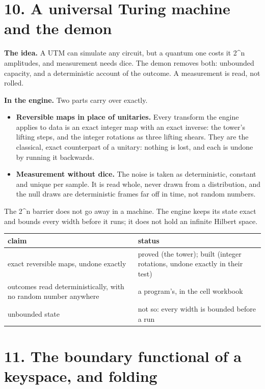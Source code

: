 \section{\texorpdfstring{10. A universal Turing machine and the demon}{10. A universal Turing machine and the demon}}

\textbf{The idea.} A UTM can simulate any circuit, but a quantum one costs it 2\textasciicircum{}n amplitudes, and measurement needs dice. The demon removes both: unbounded capacity, and a deterministic account of the outcome. A measurement is read, not rolled.

\textbf{In the engine.} Two parts carry over exactly.

\begin{itemize}
\item \textbf{Reversible maps in place of unitaries.} Every transform the engine applies to data is an exact integer map with an exact inverse: the tower's lifting steps, and the integer rotations as three lifting shears. They are the classical, exact counterpart of a unitary: nothing is lost, and each is undone by running it backwards.
\item \textbf{Measurement without dice.} The noise is taken as deterministic, constant and unique per sample. It is read whole, never drawn from a distribution, and the null draws are deterministic frames far off in time, not random numbers.
\end{itemize}

The 2\textasciicircum{}n barrier does not go away in a machine. The engine keeps its state exact and bounds every width before it runs; it does not hold an infinite Hilbert space.

{\small
\setlength{\tabcolsep}{6pt}
\begin{longtable}{>{\RaggedRight\arraybackslash}p{}>{\RaggedRight\arraybackslash}p{}}
\toprule
claim & status \\
\midrule
\endhead
exact reversible maps, undone exactly & proved (the tower); built (integer rotations, undone exactly in their test) \\
outcomes read deterministically, with no random number anywhere & a program's, in the cell workbook \\
unbounded state & not so: every width is bounded before a run \\
\bottomrule
\end{longtable}
}

\section{\texorpdfstring{11. The boundary functional of a keyspace, and folding}{11. The boundary functional of a keyspace, and folding}}

